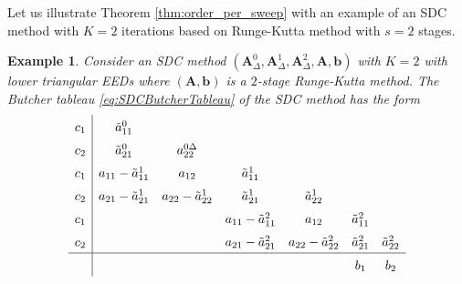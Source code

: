 \documentclass[sn-mathphys-num]{sn-jnl}%
\theoremstyle{thmstyleone}%
\theoremstyle{thmstyletwo}%
\newtheorem{example}{Example}%
\theoremstyle{thmstylethree}%
\begin{document}
Let us illustrate Theorem \ref{thm:order_per_sweep} with an example of an SDC method with $K=2$ iterations based on Runge-Kutta method with $s=2$ stages.
\begin{example}
    Consider an SDC method $(\bm{A}_\Delta^0, \bm{A}_\Delta^1, \bm{A}_\Delta^2, \bm{A}, \bm{b})$ with $K=2$ with lower triangular EEDs where $( \bm{A}, \bm{b})$ is a $2$-stage Runge-Kutta method. The Butcher tableau \eqref{eq:SDCButcherTableau} of the SDC method has the form
    \[
        \renewcommand\arraystretch{1.5}
        \begin{array}{c|cccccc}
            c_1 & \tilde{a}^{0}_{11} & & & & & \\
            c_2 & \tilde{a}^{0}_{21} & a^{0\Delta}_{22} & & & & \\
            c_1 & a_{11} - \tilde{a}^{1}_{11} & a_{12} & \tilde{a}^{1}_{11} & & & \\
            c_2 & a_{21} - \tilde{a}^{1}_{21} & a_{22} - \tilde{a}^{1}_{22} & \tilde{a}^{1}_{21} & \tilde{a}^{1}_{22} & & \\
            c_1 & & & a_{11} - \tilde{a}^{2}_{11} & a_{12} & \tilde{a}^{2}_{11} & \\
            c_2 & & & a_{21} - \tilde{a}^{2}_{21} & a_{22} - \tilde{a}^{2}_{22} & \tilde{a}^{2}_{21} & \tilde{a}^{2}_{22} \\
            \hline
            & & & & & b_1 & b_2
        \end{array}
    \]


\end{example}
\end{document}
